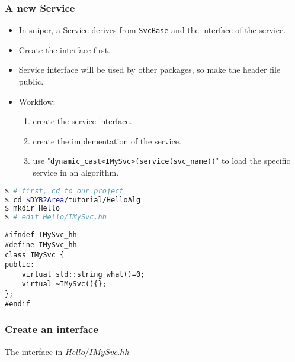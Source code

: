 
\begin{frame}
    \frametitle{A new Service}
    \begin{itemize}
        \item In sniper, a Service derives from {\tt SvcBase} and 
                the interface of the service.
        \item Create the interface first. 
        \item Service interface will be used by other packages, so make the 
                header file public.
        \item Workflow:
        \begin{enumerate}
            \item create the service interface.
            \item create the implementation of the service.
            \item use "{\tt dynamic\_cast<IMySvc>(service(svc\_name))}"
                  to load the specific service in an algorithm.
        \end{enumerate}
    \end{itemize}
\end{frame}

\newsavebox{\createinterface}
\begin{lrbox}{\createinterface}
\begin{lstlisting}[language=bash]
$ # first, cd to our project
$ cd $DYB2Area/tutorial/HelloAlg
$ mkdir Hello 
$ # edit Hello/IMySvc.hh
\end{lstlisting}
\end{lrbox}

\newsavebox{\createinterfaceheader}
\begin{lrbox}{\createinterfaceheader}
\begin{lstlisting}
#ifndef IMySvc_hh
#define IMySvc_hh
class IMySvc {
public:
    virtual std::string what()=0;
    virtual ~IMySvc(){};
};
#endif
\end{lstlisting}
\end{lrbox}

\begin{frame}
    \frametitle{Create an interface}
    \par\usebox{\createinterface}
    \begin{block}{The interface in \(Hello/IMySvc.hh\)}
    \par\usebox{\createinterfaceheader}
    \end{block}
\end{frame}
